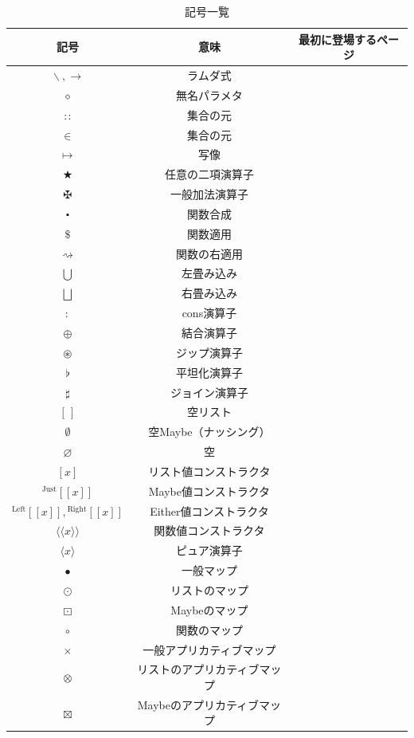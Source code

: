 \documentclass[a4paper,twocolumn]{jsbook}
\def\[{\left[\!\left[}
\def\]{\right]\!\right]}
\newcommand{\Langle}{\langle\!\langle}
\newcommand{\Rangle}{\rangle\!\rangle}
\newcommand{\mEmptyList}{{[\,]}}
\newcommand{\mNothing}{\emptyset}
\newcommand{\mPureNothing}{\varnothing}
\newcommand{\mAnonParam}{\diamond}
\DeclareMathOperator{\mAppend}{\oplus}
\DeclareMathOperator{\mApply}{\$}
\DeclareMathOperator{\mApplyRight}{\rightsquigarrow}
\DeclareMathOperator{\mAppMap}{\times}
\DeclareMathOperator{\mAppMapList}{\otimes}
\DeclareMathOperator{\mAppMapMaybe}{\boxtimes}
\DeclareMathOperator{\mBinOp}{\bigstar}
\DeclareMathOperator{\mComp}{\centerdot}
\DeclareMathOperator{\mConcat}{\flat}
\DeclareMathOperator{\mCons}{:}
\DeclareMathOperator*{\mFold}{\bigcup}
\DeclareMathOperator*{\mFoldRight}{\bigsqcup}
\DeclareMathOperator{\mIn}{{:\!:}}
\DeclareMathOperator{\mJoin}{\sharp}
\DeclareMathOperator{\mLambda}{\backslash}
\DeclareMathOperator{\mLambdaArrow}{\rightarrow}
\DeclareMathOperator{\mMap}{\bullet}
\DeclareMathOperator{\mMapFunc}{\circ}
\DeclareMathOperator{\mMapList}{\odot}
\DeclareMathOperator{\mMapMaybe}{\boxdot}
\DeclareMathOperator{\mMapsTo}{\mapsto}
\DeclareMathOperator{\mPlus}{\maltese}
\DeclareMathOperator{\mZip}{\circledast}
\newcommand{\mSpecialSub}[1]{\text{#1}}
\newcommand{\mLeft}{\mSpecialSub{Left}}
\newcommand{\mRight}{\mSpecialSub{Right}}
\newcommand{\mGenericValueConstructor}[1]{\mathrm{#1}}
\newcommand{\mGenericWith}[2]{{}^\mGenericValueConstructor{#1}\[#2\]}
\newcommand{\mLeftWith}[1]{\mGenericWith{\mLeft}{#1}}
\newcommand{\mRightWith}[1]{\mGenericWith{\mRight}{#1}}
\newcommand{\mJustWith}[1]{\mGenericWith{Just}{#1}}
\newcommand{\mFuncWith}[1]{\Langle#1\Rangle}
\newcommand{\mListWith}[1]{\left[#1\right]}
\newcommand{\mPureWith}[1]{\langle#1\rangle}
\begin{document}
\begin{table}[p]
\caption{記号一覧}
\begin{center}
\begin{tabular}{||c|c|c||}
\hline
記号&意味&最初に登場するページ\\
\hline\hline
$\mLambda, \mLambdaArrow$&ラムダ式&\\
$\mAnonParam$&無名パラメタ&\\
\hline
$\mIn$&集合の元&\\
$\in$&集合の元&\\
$\mMapsTo$&写像&\\\hline
$\mBinOp$&任意の二項演算子&\\
$\mPlus$&一般加法演算子&\\
\hline
$\mComp$&関数合成&\\
$\mApply$&関数適用&\\
$\mApplyRight$&関数の右適用&\\\hline
$\mFold$&左畳み込み&\\
$\mFoldRight$&右畳み込み&\\
\hline
$\mCons$&cons演算子&\\
$\mAppend$&結合演算子&\\
$\mZip$&ジップ演算子&\\
$\mConcat$&平坦化演算子&\\
$\mJoin$&ジョイン演算子&\\
\hline
$\mEmptyList$&空リスト&\\
$\mNothing$&空Maybe（ナッシング）&\\
$\mPureNothing$&空&\\
\hline
$\mListWith{x}$&リスト値コンストラクタ&\\
$\mJustWith{x}$&Maybe値コンストラクタ&\\
$\mLeftWith{x},\mRightWith{x}$&Either値コンストラクタ&\\
$\mFuncWith{x}$&関数値コンストラクタ&\\
$\mPureWith{x}$&ピュア演算子&\\
\hline
$\mMap$&一般マップ&\\
$\mMapList$&リストのマップ&\\
$\mMapMaybe$&Maybeのマップ&\\
$\mMapFunc$&関数のマップ&\\
\hline
$\mAppMap$&一般アプリカティブマップ&\\
$\mAppMapList$&リストのアプリカティブマップ&\\
$\mAppMapMaybe$&Maybeのアプリカティブマップ&\\

\end{tabular}
\end{center}
\end{table}
\end{document}
